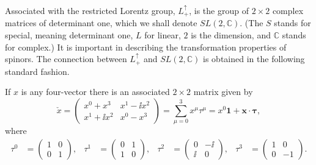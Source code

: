 Associated with the restricted Lorentz group, $L^\uparrow_+$, is the group of
$2\times2$ complex matrices of determinant one, which we shall denote
$SL(2,\mathbb C)$. (The $S$ stands for special, meaning determinant one, $L$
for linear, $2$ is the dimension, and $\mathbb C$ stands for complex.) It is
important in describing the transformation properties of spinors. The
connection between $L^\uparrow_+$ and $SL(2,\mathbb C)$ is obtained in the
following standard fashion.



If $x$ is any four-vector there is an associated $2\times2$ matrix given by
\begin{equation}
  \check{x}
  =
  \begin{pmatrix}
    x^0+x^3&x^1-\ii x^2\\
    x^1+\ii x^2&x^0-x^3
  \end{pmatrix}
  =
  \sum_{\mu=0}^{3}x^\mu\tau^\mu
  =x^0\mathbf{1}+\mathbf{x}\mathbin{\cdot}\boldsymbol{\tau},
  \tag{1-11}\label{eq:ch1-check-x}
\end{equation}
where
\[
\begin{aligned}
  \tau^0&=\begin{pmatrix}1&0\\0&1\end{pmatrix}, &
  \tau^1&=\begin{pmatrix}0&1\\1&0\end{pmatrix}, &
  \tau^2&=\begin{pmatrix}0&-\ii\\\ii&0\end{pmatrix}, &
  \tau^3&=\begin{pmatrix}1&0\\0&-1\end{pmatrix}.
\end{aligned}
\]


